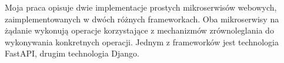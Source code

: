 Moja praca opisuje dwie implementacje prostych mikroserwisów webowych, zaimplementowanych w dwóch różnych frameworkach. Oba mikroserwisy na żądanie wykonują operacje korzystające z mechanizmów zrównoleglania do wykonywania konkretnych operacji. Jednym z frameworków jest technologia FastAPI, drugim technologia Django.